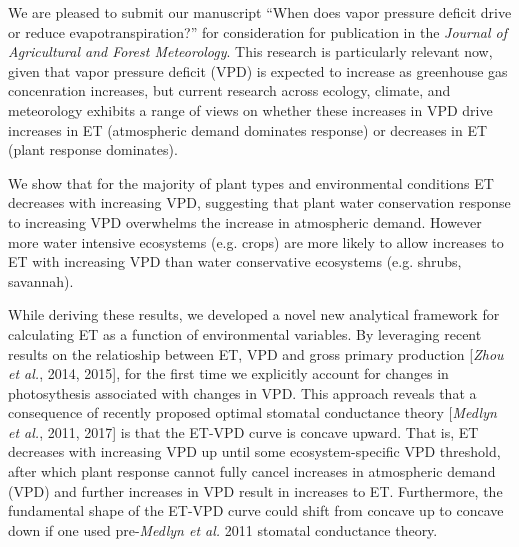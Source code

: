 \documentclass[10pt,stdletter,dateno]{newlfm}
\begin{document}
\begin{newlfm}

  We are pleased to submit our manuscript ``When does vapor pressure deficit drive or reduce evapotranspiration?'' for consideration for publication in the \textit{Journal of Agricultural and Forest Meteorology}. This research is particularly relevant now, given that vapor pressure deficit (VPD) is expected to increase as greenhouse gas concenration increases, but current research across ecology, climate, and meteorology exhibits a range of views on whether these increases in VPD drive increases in ET (atmospheric demand dominates response) or decreases in ET (plant response dominates).

  We show that for the majority of plant types and environmental conditions ET decreases with increasing VPD, suggesting that plant water conservation response to increasing VPD overwhelms the increase in atmospheric demand. However more water intensive ecosystems (e.g. crops) are more likely to allow increases to ET with increasing VPD than water conservative ecosystems (e.g. shrubs, savannah).

  While deriving these results, we developed a novel new analytical framework for calculating ET as a function of environmental variables. By leveraging recent results on the relatioship between ET, VPD and gross primary production [\textit{Zhou et al.}, 2014, 2015], for the first time we explicitly account for changes in photosythesis associated with changes in VPD. This approach reveals that a consequence of recently proposed optimal stomatal conductance theory [\textit{Medlyn et al.}, 2011, 2017] is that the ET-VPD curve is concave upward. That is, ET decreases with increasing VPD up until some ecosystem-specific VPD threshold, after which plant response cannot fully cancel increases in atmospheric demand (VPD) and further increases in VPD result in increases to ET. Furthermore, the fundamental shape of the ET-VPD curve could shift from concave up to concave down if one used pre-\textit{Medlyn et al.} 2011 stomatal conductance theory.


\end{newlfm}
\end{document}
